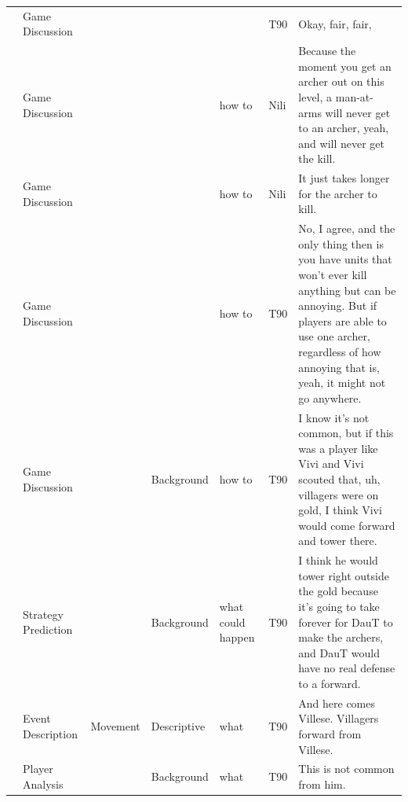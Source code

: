 {\begin{longtable}{@{}>{\theAppRow}r|L{2.3cm}L{2.2cm}L{1.4cm}L{2.2cm}L{0.5cm}U{5.6cm}@{}}
    & Game Discussion       &                      &             &                   & T90     & Okay, fair, fair,                                                                                                                                                                                                        \\
    & Game Discussion       &                      &             & how to            & Nili    & Because the moment you get an archer out on this level, a man-at-arms will never get to an archer, yeah, and will never get the kill.                                                                                    \\
    & Game Discussion       &                      &             & how to            & Nili    & It just takes longer for the archer to kill.                                                                                                                                                                             \\
    & Game Discussion       &                      &             & how to            & T90     & No, I agree, and the only thing then is you have units that won't ever kill anything but can be annoying. But if players are able to use one archer, regardless of how annoying that is, yeah, it might not go anywhere. \\
    & Game Discussion       &                      & Background  & how to            & T90     & I know it's not common, but if this was a player like Vivi and Vivi scouted that, uh, villagers were on gold, I think Vivi would come forward and tower there.                                                           \\
    & Strategy Prediction   &                      & Background  & what could happen & T90     & I think he would tower right outside the gold because it's going to take forever for DauT to make the archers, and DauT would have no real defense to a forward.                                                         \\
    & Event Description     & Movement             & Descriptive   & what              & T90     & And here comes Villese. Villagers forward from Villese.                                                                                                                                                                  \\
    & Player Analysis       &                      & Background  & what              & T90     & This is not common from him.                                                                                                                                                                                             \\

\end{longtable}}
